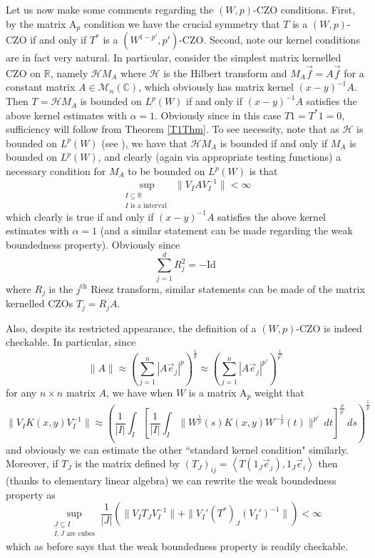 \documentclass[12pt,reqno ]{amsart}
\numberwithin{equation}{section}
\theoremstyle{definition}
\newcommand{\R}{\ensuremath{\mathbb{R}}}
\renewcommand{\H}{\ensuremath{\mathcal{H}}}
\newcommand{\Mn}{\ensuremath{\mathcal{M}_{n }}(\mathbb{C})}
\newcommand{\V}[1]{\ensuremath{\vec{#1}}}
\newcommand{\ip}[2]{\ensuremath{\left\langle#1,#2\right\rangle}}
\begin{document}
Let us now make some comments regarding the $(W, p)$-CZO conditions. First, by the matrix A${}_p$ condition we have the crucial symmetry that $T$ is a $(W, p)$-CZO if and only if $T^*$ is a $(W^{1 - p'}, p')$-CZO.   Second, note our kernel conditions are in fact very natural.  In particular, consider the simplest matrix kernelled CZO on $\mathbb{R}$, namely $\H M_A$  where $\H$ is the Hilbert transform and $M_A \vec{f} = A \vec{f}$ for a constant matrix $A \in \Mn$, which obviously has matrix kernel $(x - y)^{-1} A$.  Then $T = \H M_A$ is bounded on $L^p(W)$ if and only if $(x - y)^{-1} A$ satisfies the above kernel estimates with $\alpha = 1$. Obviously since in this case $T1 = T^*1 = 0$, sufficiency will follow from Theorem \ref{T1Thm}.   To see necessity, note that as $\H$ is bounded on $L^p(W)$ (see \cite{NT, V}), we have that $\H M_A$ is bounded if and only if $M_A$ is bounded on $L^p(W)$, and clearly (again via appropriate testing functions) a necessary condition for $M_A$ to be bounded on $L^p(W)$ is that \begin{equation} \label{Acond} \sup_{\substack{I \subseteq \R \\ I \text{ is a interval }}}\|V_I A V_I ^{-1}\| < \infty \end{equation}  which clearly is true if and only if $(x - y)^{-1} A$ satisfies the above kernel estimates with $\alpha = 1$ (and a similar statement can be made regarding the weak boundedness property). Obviously since \begin{equation*} \sum_{j = 1}^d R_j ^2 = - \text{Id} \end{equation*} where $R_j$ is the $j^{\text{th}}$ Riesz transform, similar statements can be made of the matrix kernelled CZOs $T_j = R_j A$.

Also, despite its restricted appearance, the definition of a $(W, p)$-CZO is indeed checkable.  In particular, since \begin{equation*} \|A\| \approx \left(\sum_{j = 1}^n |A\V{e}_j|^p \right)^\frac{1}{p} \approx \left(\sum_{j = 1}^n |A\V{e}_j|^{p'} \right)^\frac{1}{p'} \end{equation*} for any $n \times n$ matrix $A$, we have when $W$ is a matrix A${}_p$ weight that \begin{equation*} \|V_I K(x, y) V_I ^{-1} \| \approx  \left( \frac{1}{|I|} \int_I \left[ \frac{1}{|I|} \int_I \|W^{\frac{1}{p}}(s) K(x, y)  W^{- \frac{1}{p}} (t) \|^{p'} \, dt \right]^\frac{p}{p'} \, ds\right)^\frac{1}{p}  \end{equation*} and obviously we can estimate the other ``standard kernel condition" similarly.  Moreover, if $T _J $ is the matrix defined by $(T _J)_{ij} =  \ip{  T  (1_J \V{e}_j)}{ 1_J \V{e}_i} $  then (thanks to elementary linear algebra) we can rewrite the weak boundedness property as \begin{equation*}\sup_{\substack{J  \subseteq I \\  I, J \text{ are cubes}}}   \frac{1}{|J|}  \left(\| V_I T _J  V_I ^{-1}\| + \| V_I ' (T^*) _ J  (V_I') ^{-1} \| \right) < \infty  \end{equation*}  which as before says that the weak boundedness property is readily  checkable.
\end{document}
